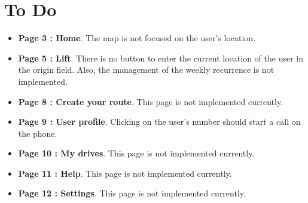 \section{To Do}
\begin{itemize}
\item {\bf Page 3 : Home}. The map is not focused on the user's location.
\item {\bf Page 5 : Lift}. There is no button to enter the current location of the user in the origin field. Also, the management of the weekly recurrence is not implemented.
	\item {\bf Page 8 : Create your route}. This page is not implemented currently.
	\item {\bf Page 9 : User profile}. Clicking on the user's number should start a call on the phone.
	 \item {\bf Page 10 : My drives}. This page is not implemented currently.
	 \item {\bf Page 11 : Help}. This page is not implemented currently.
	 \item {\bf Page 12 : Settings}. This page is not implemented currently.
\end{itemize}